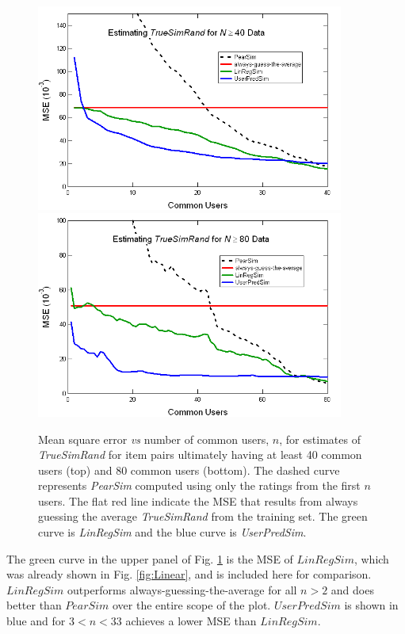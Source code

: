 \documentclass[11pt]{article}
\begin{document}
{\begin{figure}[!htbp]
    \centering
    \includegraphics[width=0.9\textwidth]{MSE_SimR_40.png}
    \includegraphics[width=0.9\textwidth]{MSE_SimR_80.png}
	\caption{Mean square error {\em vs} number of common users, $n$, for
estimates of {\em TrueSimRand} for item pairs ultimately having at least 40
common users (top) and 80 common users (bottom). The dashed curve
represents {\em PearSim} computed using only the ratings from the first $n$
users. The flat red line indicate the MSE that results from always guessing
the average {\em TrueSimRand} from the training set. The green curve is {\em
LinRegSim} and the blue curve is {\em UserPredSim}. }
    \label{fig:MSE_SimR}
\end{figure}

The green curve in the upper panel of Fig. \ref{fig:MSE_SimR} is the MSE of
$LinRegSim$, which was already shown in Fig. \ref{fig:Linear}, and is included
here for comparison.  $LinRegSim$ outperforms always-guessing-the-average for
all $n > 2$ and does better than $PearSim$ over the entire scope of the plot.
$UserPredSim$ is shown in blue and for $3 < n < 33$ achieves a lower MSE than
$LinRegSim$.

}
\end{document}
